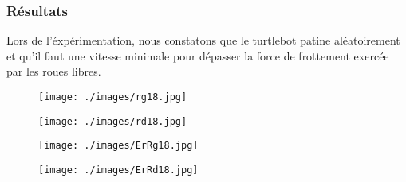 \documentclass[10pt,a4paper]{article}
\begin{document}
\subsubsection{Résultats}

Lors de l'éxpérimentation, nous constatons que le turtlebot patine aléatoirement et qu'il faut une vitesse minimale pour dépasser la force de frottement exercée par les roues libres. \\

\vspace{5mm}
\begin{figure}[!]
\begin{minipage}{0.46\linewidth}
    	\centering
        \texttt{[image: ./images/rg18.jpg]}
    \end{minipage}\hfill
    \begin{minipage}[c]{.46\linewidth}
        \centering
        \texttt{[image: ./images/rd18.jpg]}
    \end{minipage}
\end{figure}

\begin{figure}[!]
    \begin{minipage}[c]{.46\linewidth}
        \centering
        \texttt{[image: ./images/ErRg18.jpg]}
    \end{minipage}
    \hfill%
    \begin{minipage}[c]{.46\linewidth}
        \centering
        \texttt{[image: ./images/ErRd18.jpg]}
    \end{minipage}
\end{figure}
\end{document}
